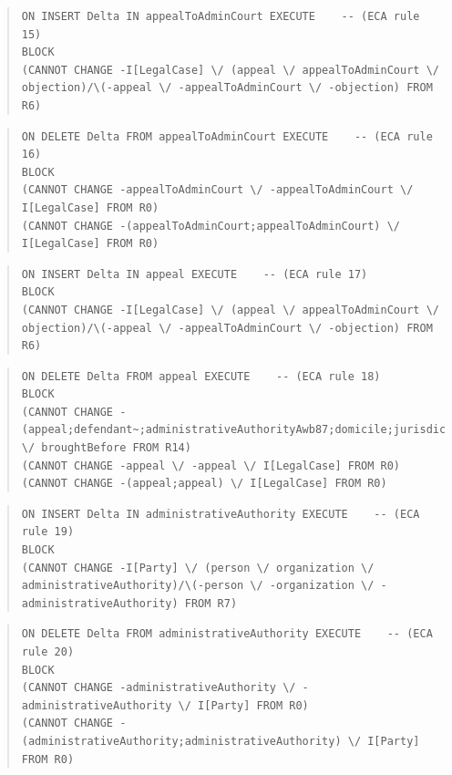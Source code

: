 \documentclass[10pt,a4paper]{report}              %
\theoremstyle{plain}\theorembodyfont{\rmfamily}\newtheorem{definition}{Definition}[section]
\theoremstyle{plain}\theorembodyfont{\rmfamily}\newtheorem{designrule}[definition]{Requirement}
\begin{document}
\begin{quote}
\begin{verbatim}
ON INSERT Delta IN appealToAdminCourt EXECUTE    -- (ECA rule 15)
BLOCK
(CANNOT CHANGE -I[LegalCase] \/ (appeal \/ appealToAdminCourt \/ objection)/\(-appeal \/ -appealToAdminCourt \/ -objection) FROM R6)
\end{verbatim}
\end{quote}
\begin{quote}
\begin{verbatim}
ON DELETE Delta FROM appealToAdminCourt EXECUTE    -- (ECA rule 16)
BLOCK
(CANNOT CHANGE -appealToAdminCourt \/ -appealToAdminCourt \/ I[LegalCase] FROM R0)
(CANNOT CHANGE -(appealToAdminCourt;appealToAdminCourt) \/ I[LegalCase] FROM R0)
\end{verbatim}
\end{quote}
\begin{quote}
\begin{verbatim}
ON INSERT Delta IN appeal EXECUTE    -- (ECA rule 17)
BLOCK
(CANNOT CHANGE -I[LegalCase] \/ (appeal \/ appealToAdminCourt \/ objection)/\(-appeal \/ -appealToAdminCourt \/ -objection) FROM R6)
\end{verbatim}
\end{quote}
\begin{quote}
\begin{verbatim}
ON DELETE Delta FROM appeal EXECUTE    -- (ECA rule 18)
BLOCK
(CANNOT CHANGE -(appeal;defendant~;administrativeAuthorityAwb87;domicile;jurisdiction) \/ broughtBefore FROM R14)
(CANNOT CHANGE -appeal \/ -appeal \/ I[LegalCase] FROM R0)
(CANNOT CHANGE -(appeal;appeal) \/ I[LegalCase] FROM R0)
\end{verbatim}
\end{quote}
\begin{quote}
\begin{verbatim}
ON INSERT Delta IN administrativeAuthority EXECUTE    -- (ECA rule 19)
BLOCK
(CANNOT CHANGE -I[Party] \/ (person \/ organization \/ administrativeAuthority)/\(-person \/ -organization \/ -administrativeAuthority) FROM R7)
\end{verbatim}
\end{quote}
\begin{quote}
\begin{verbatim}
ON DELETE Delta FROM administrativeAuthority EXECUTE    -- (ECA rule 20)
BLOCK
(CANNOT CHANGE -administrativeAuthority \/ -administrativeAuthority \/ I[Party] FROM R0)
(CANNOT CHANGE -(administrativeAuthority;administrativeAuthority) \/ I[Party] FROM R0)
\end{verbatim}
\end{quote}
\end{document}

